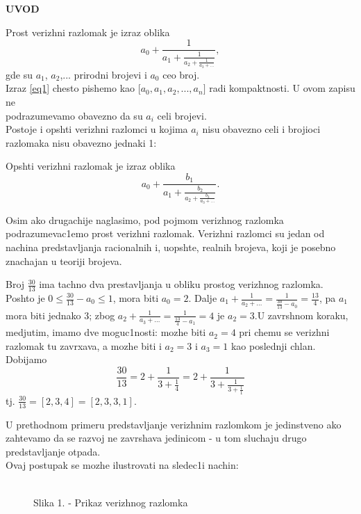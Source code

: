 \documentclass[11pt]{article}
\begin{document}
\newpage
\begin{center}
    \textbf{\Large{UVOD}}
\end{center}
\begin{df}
Prost verizhni razlomak je izraz oblika
\begin{equation}
\label{eq1}
    a_0+\frac{1}{a_1+\frac{1}{a_2+\frac{1}{a_3+\dots}}},\tag{$*$}
\end{equation}
gde su $a_1$, $a_2$,... prirodni brojevi i $a_0$ ceo broj.\\

Izraz \eqref{eq1} chesto pishemo kao [$a_0, a_1, a_2,...,a_n]$ radi kompaktnosti. U ovom zapisu ne \\\text podrazumevamo obavezno da su $a_i$ celi brojevi.\\
Postoje i opshti verizhni razlomci u kojima $a_i$ nisu obavezno celi i brojioci razlomaka nisu obavezno jednaki 1:
\end{df}
\begin{df}
Opshti verizhni razlomak je izraz oblika $$ a_0+\frac{b_1}{a_1+\frac{b_2}{a_2+\frac{b_3}{a_3+\dots}}}.$$
\end{df}
Osim ako drugachije naglasimo, pod pojmom verizhnog razlomka podrazumevac1emo prost verizhni razlomak. Verizhni razlomci su jedan od nachina predstavljanja racionalnih i, uopshte, realnih brojeva, koji je posebno znachajan u teoriji brojeva.\\

\begin{pr}
Broj $\frac{30}{13}$ ima tachno dva prestavljanja u obliku prostog verizhnog razlomka.\\Poshto je $0\leq\frac{30}{13}-a_0\leq 1$, mora biti $a_0=2$. Dalje $a_1+\frac{1}{a_2+\dots}=\frac{1}{\frac{30}{13}-a_0}=\frac{13}{4}$, pa $a_1$ mora biti jednako 3; zbog $a_2+\frac{1}{a_3+\dots}=\frac{1}{\frac{13}{4}-a_1}=4$ je $a_2=3$.U zavrshnom koraku, medjutim, imamo dve moguc1nosti: mozhe biti $a_2=4$ pri chemu se verizhni razlomak tu zavrxava, a mozhe biti i $a_2=3$ i $a_3=1$ kao poslednji chlan. Dobijamo
$$\frac{30}{13}=2+\frac{1}{3+\frac{1}{4}}=2+\frac{1}{3+\frac{1}{3+\frac{1}{1}}}$$
tj. $\frac{30}{13}=[2,3,4]=[2,3,3,1]$.
\end{pr}
U prethodnom primeru predstavljanje verizhnim razlomkom je jedinstveno ako zahtevamo da se razvoj ne zavrshava jedinicom - u tom sluchaju drugo predstavljanje otpada.\\
Ovaj postupak se mozhe ilustrovati na sledec1i nachin:
\\[1mm]
\begin{figure}[h]
\centering
\\
Slika 1. - Prikaz verizhnog razlomka
  \label{fig:tikz1}
\end{figure}
\end{document}
